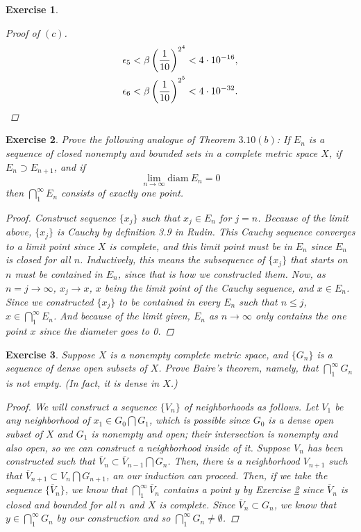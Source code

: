 \documentclass[10pt,letterpaper]{amsart}
\newtheorem{exercise}{Exercise}[section]
\theoremstyle{definition}
\theoremstyle{remark}
\numberwithin{equation}{exercise}
\begin{document}
\begin{multicols}{2}
\begin{exercise}
\begin{proof}[Proof of $(c)$]
\begin{align*}
        \epsilon_{5} &< \beta \left( \frac{1}{10} \right)^{2^4} < 4 \cdot 10^{-16},\\
        \epsilon_{6} &< \beta \left( \frac{1}{10} \right)^{2^5} < 4 \cdot 10^{-32}.\qedhere
      \end{align*}
    \end{proof}
  \end{exercise}
  \setcounter{exercise}{20}
  \begin{exercise}\label{3.21}
    Prove the following analogue of Theorem $3.10(b)$: If ${E_n}$ is a sequence of closed nonempty and bounded sets in a \emph{complete} metric space $X$, if $E_n \supset E_{n+1}$, and if
    \begin{equation*}
      \lim_{n \rightarrow \infty} \mathrm{diam}\ E_n = 0
    \end{equation*}
    then $\bigcap^\infty_1 E_n$ consists of exactly one point.
    \begin{proof}
      Construct sequence $\{x_j\}$ such that $x_j \in E_n$ for $j = n$. Because of the limit above, $\{x_j\}$ is Cauchy by definition 3.9 in Rudin. This Cauchy sequence converges to a limit point since $X$ is complete, and this limit point must be in $E_n$ since $E_n$ is closed for all $n$. Inductively, this means the subsequence of $\{x_j\}$ that starts on $n$ must be contained in $E_n$, since that is how we constructed them. Now, as $n = j \rightarrow \infty$, $x_j \rightarrow x$, $x$ being the limit point of the Cauchy sequence, and $x \in E_n$. Since we constructed $\{x_j\}$ to be contained in every $E_n$ such that $n \le j$, $x \in \bigcap^\infty_1 E_n$. And because of the limit given, $E_n$ as $n \rightarrow \infty$ only contains the one point $x$ since the diameter goes to 0.
    \end{proof}
  \end{exercise}
  \begin{exercise}\label{3.22}
    Suppose $X$ is a non\-empty complete metric space, and $\{G_n\}$ is a sequence of dense open subsets of $X$. Prove Baire's theorem, namely, that $\bigcap^\infty_1 G_n$ is not empty. (In fact, it is dense in $X$.)
    \begin{proof}
      We will construct a sequence $\{V_n\}$ of neighborhoods as follows. Let $V_1$ be any neighborhood of $x_1 \in G_0 \bigcap G_1$, which is possible since $G_0$ is a dense open subset of $X$ and $G_1$ is nonempty and open; their intersection is nonempty and also open, so we can construct a neighborhood inside of it. Suppose $V_n$ has been constructed such that $\overline{V}_n \subset \overline{V}_{n-1} \bigcap G_n$. Then, there is a neighborhood $V_{n+1}$ such that $\overline{V}_{n+1} \subset V_n \bigcap G_{n+1}$, an our induction can proceed. Then, if we take the sequence $\{\overline{V}_n\}$, we know that $\bigcap^\infty_1 \overline{V}_n$ contains a point $y$ by Exercise \ref{3.21} since $\overline{V}_n$ is closed and bounded for all $n$ and $X$ is complete. Since $\overline{V}_n \subset G_n$, we know that $y \in \bigcap^\infty_1 G_n$ by our construction and so $\bigcap^\infty_1 G_n \neq \emptyset$.
    \end{proof}
  \end{exercise}

\end{multicols}
\end{document}

